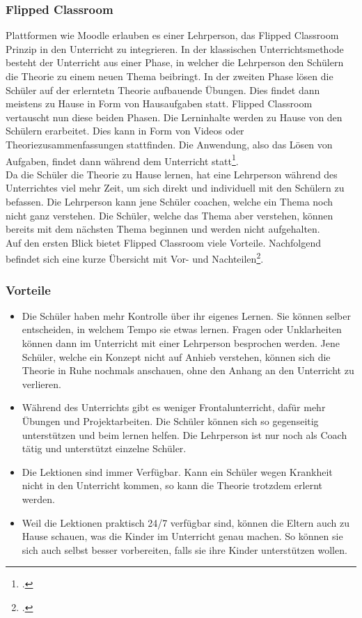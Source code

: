 \subsubsection{Flipped Classroom}
Plattformen wie Moodle erlauben es einer Lehrperson, das Flipped Classroom Prinzip in den Unterricht zu integrieren. In der klassischen Unterrichtsmethode besteht der Unterricht aus einer Phase, in welcher die Lehrperson den Schülern die Theorie zu einem neuen Thema beibringt. In der zweiten Phase lösen die Schüler auf der erlerntetn Theorie aufbauende Übungen. Dies findet dann meistens zu Hause in Form von Hausaufgaben statt. Flipped Classroom vertauscht nun diese beiden Phasen. Die Lerninhalte werden zu Hause von den Schülern erarbeitet. Dies kann in Form von Videos oder Theoriezusammenfassungen stattfinden. Die Anwendung, also das Lösen von Aufgaben, findet dann während dem Unterricht statt\footcite{flipped_classroom_theorie}. \\

Da die Schüler die Theorie zu Hause lernen, hat eine Lehrperson während des Unterrichtes viel mehr Zeit, um sich direkt und individuell mit den Schülern zu befassen. Die Lehrperson kann jene Schüler coachen, welche ein Thema noch nicht ganz verstehen. Die Schüler, welche das Thema aber verstehen, können bereits mit dem nächsten Thema beginnen und werden nicht aufgehalten. \\

Auf den ersten Blick bietet Flipped Classroom viele Vorteile. Nachfolgend befindet sich eine kurze Übersicht mit Vor- und Nachteilen\footcite{flipped_classroom_pro_con}.

\newpage
\subsubsection*{Vorteile}
\begin{itemize}
	\item Die Schüler haben mehr Kontrolle über ihr eigenes Lernen. Sie können selber entscheiden, in welchem Tempo sie etwas lernen. Fragen oder Unklarheiten können dann im Unterricht mit einer Lehrperson besprochen werden. Jene Schüler, welche ein Konzept nicht auf Anhieb verstehen, können sich die Theorie in Ruhe nochmals anschauen, ohne den Anhang an den Unterricht zu verlieren.
	\item Während des Unterrichts gibt es weniger Frontalunterricht, dafür mehr Übungen und Projektarbeiten. Die Schüler können sich so gegenseitig unterstützen und beim lernen helfen. Die Lehrperson ist nur noch als Coach tätig und unterstützt einzelne Schüler.
	\item Die Lektionen sind immer Verfügbar. Kann ein Schüler wegen Krankheit nicht in den Unterricht kommen, so kann die Theorie trotzdem erlernt werden. 
	\item Weil die Lektionen praktisch 24/7 verfügbar sind, können die Eltern auch zu Hause schauen, was die Kinder im Unterricht genau machen. So können sie sich auch selbst besser vorbereiten, falls sie ihre Kinder unterstützen wollen. 
\end{itemize}

